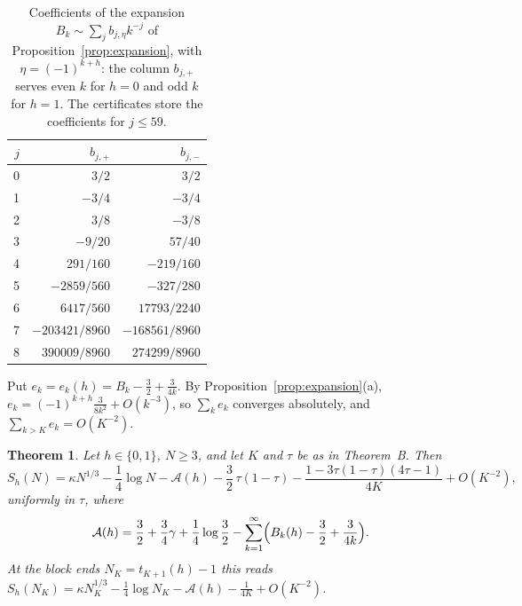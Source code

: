 \documentclass[11pt]{article}
\newtheorem{theorem}{Theorem}[section]
\theoremstyle{definition}
\theoremstyle{remark}
\newcommand{\Alp}{\mathcal{A}}
\begin{document}
\begin{table}[ht]
\centering
\begin{tabular}{rrr}
\toprule
$j$ & $b_{j,+}$ & $b_{j,-}$\\
\midrule
0 & $3/2$ & $3/2$ \\
1 & $-3/4$ & $-3/4$ \\
2 & $3/8$ & $-3/8$ \\
3 & $-9/20$ & $57/40$ \\
4 & $291/160$ & $-219/160$ \\
5 & $-2859/560$ & $-327/280$ \\
6 & $6417/560$ & $17793/2240$ \\
7 & $-203421/8960$ & $-168561/8960$ \\
8 & $390009/8960$ & $274299/8960$ \\
\bottomrule
\end{tabular}
\caption{Coefficients of the expansion
$B_k\sim\sum_jb_{j,\eta}k^{-j}$ of Proposition~\ref{prop:expansion}, with
$\eta=(-1)^{k+h}$: the column $b_{j,+}$ serves even $k$ for $h=0$ and odd
$k$ for $h=1$. The certificates store the coefficients for $j\le59$.}
\label{tab:coefficients}
\end{table}

Put $e_k=e_k(h)=B_k-\frac32+\frac3{4k}$. By
Proposition~\ref{prop:expansion}(a),
$e_k=(-1)^{k+h}\frac{3}{8k^2}+O(k^{-3})$, so $\sum_ke_k$ converges
absolutely, and $\sum_{k>K}e_k=O(K^{-2})$.

\begin{theorem}\label{thm:asymptotics}
Let $h\in\{0,1\}$, $N\ge3$, and let $K$ and $\tau$ be as in Theorem~B.
Then
\begin{equation}\label{eq:mainasym}
S_h(N)=\kappa N^{1/3}-\frac14\log N-\Alp(h)-\frac32\,\tau(1-\tau)
-\frac{1-3\tau(1-\tau)(4\tau-1)}{4K}+O(K^{-2}),
\end{equation}
uniformly in $\tau$, where
\begin{equation}\label{eq:series}
\Alp(h)=\frac32+\frac34\gamma+\frac14\log\frac32-\sum_{k=1}^{\infty}
\Bigl(B_k(h)-\frac32+\frac3{4k}\Bigr).
\end{equation}
At the block ends $N_K=t_{K+1}(h)-1$ this reads
$S_h(N_K)=\kappa N_K^{1/3}-\frac14\log N_K-\Alp(h)-\frac1{4K}+O(K^{-2})$.
\end{theorem}
\end{document}
